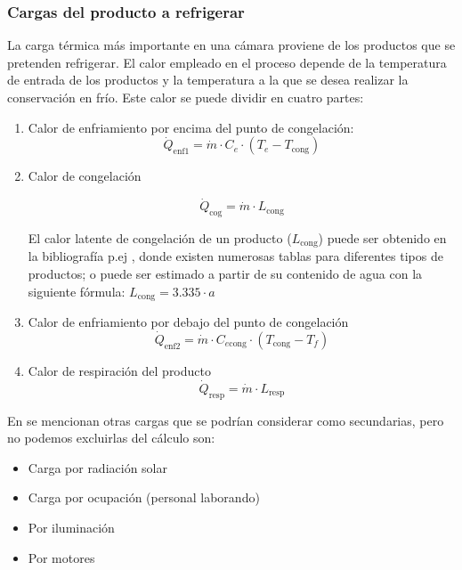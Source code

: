  \subsubsection{Cargas del producto a refrigerar}
 La carga térmica más importante en una cámara proviene de los productos que se pretenden refrigerar. El calor empleado en el proceso depende de la temperatura de entrada de los productos y la temperatura a la que se desea realizar la conservación en frío. Este calor se puede dividir en cuatro partes:
 \begin{enumerate}
 	\item Calor de enfriamiento por encima del punto de congelación:
  \begin{equation}
 	\dot{Q}_{\text{enf1}} = \dot{m} \cdot C_e \cdot (T_e - T_{\text{cong}})
 \end{equation}
 \item Calor de congelación

 \begin{equation}
 	\dot{Q}_{\text{cog}} = \dot{m} \cdot L_{\text{cong}}
 \end{equation}
 
 El calor latente de congelación de un producto ($L_{\text{cong}}$) puede ser obtenido en la bibliografía p.ej \cite{bohn}, donde existen numerosas tablas para diferentes tipos de productos; o puede ser estimado a partir de su contenido de agua con la siguiente fórmula: $L_{\text{cong}} = 3{.}335 \cdot a$
 \item Calor de enfriamiento por debajo del punto de congelación
 \begin{equation}
 	\dot{Q}_{\text{enf2}} = \dot{m} \cdot C_{e\text{cong}} \cdot (T_{\text{cong}} - T_f)
 \end{equation}
 \item Calor de respiración del producto
 \begin{equation}
 	\dot{Q}_{\text{resp}} = \dot{m} \cdot L_{\text{resp}}
 \end{equation}
\end{enumerate}
 
 En  se mencionan otras cargas que se podrían considerar como secundarias, pero no podemos excluirlas del cálculo son:
\begin{itemize}
	\item  Carga por radiación solar
	\item Carga por ocupación (personal laborando)
	\item Por iluminación
	\item  Por motores
	
\end{itemize}

